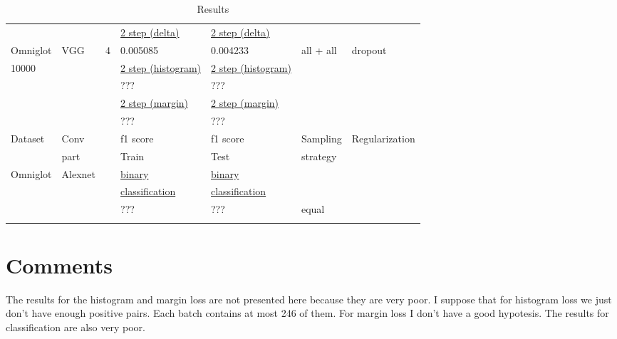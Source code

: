 \documentclass[a4paper,12pt]{extreport}
\begin{document}
\begin{longtable}[h!]{|l|l|l|l|l|l|l|}
            & & & \underline{2 step (delta)}     & \underline{2 step (delta)}     & &                      \\
            Omniglot & VGG & 4 & 0.005085 & 0.004233 & all + all & dropout                        \\ \cline{4-7}
            10000 & & & \underline{2 step (histogram)} & \underline{2 step (histogram)} & &                      \\
            & & & ??? & ??? & &  \\\cline{4-7}
            & & & \underline{2 step (margin)}    & \underline{2 step (margin)}    & &                      \\
            & & & ??? & ??? & &  \\\cline{4-7}
            \hline
            Dataset & Conv & & f1 score & f1 score & Sampling & Regularization       \\
            & part & & Train & Test & strategy &                      \\ \hline
            Omniglot & Alexnet & & \underline{binary} &\underline{binary} & &                      \\
            & & & \underline{classification} & \underline{classification }& &                      \\
            & & & ??? & ??? & equal &                      \\
            \hline
        \caption{Results}
        \label{table:main_table}
    \end{longtable}

    \section{Comments}\label{sec:comments}

    The results for the histogram and margin loss are not presented here because they are very poor.
    I suppose that for histogram loss we just don't have enough positive pairs. Each batch contains at most 246 of them.
    For margin loss I don't have a good hypotesis.
    The results for classification are also very poor.
    \newline
\end{document}
